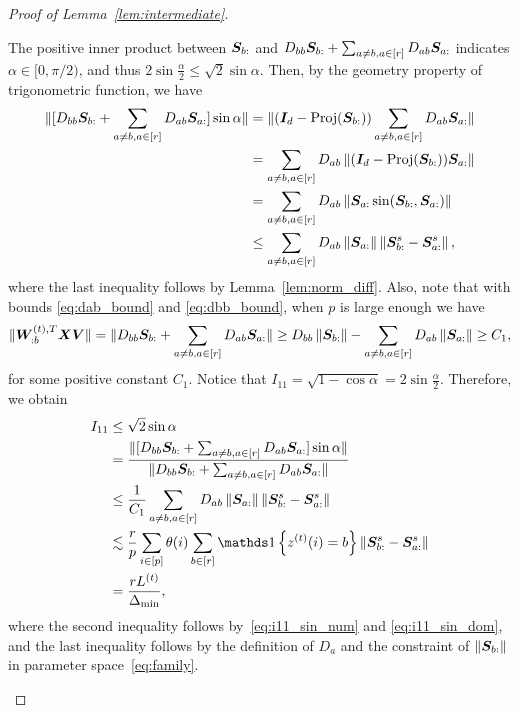 \documentclass[lettersize,journal]{IEEEtran}
\theoremstyle{definition}
\theoremstyle{definition}
\newcommand{\offf}[1]{\left\{#1\right\}}
\begin{document}
\begin{proof}[Proof of Lemma~\ref{lem:intermediate}]
\begin{enumerate}
    The positive inner product between $\bm S_{b:}$ and $D_{bb} \bm S_{b:} + \sum_{a \neq b, a \in [r]} D_{ab} \bm S_{a:}$ indicates $\alpha \in [0,  \pi/2)$, and thus $2\sin \frac{\alpha}{2} \leq \sqrt{2} \sin \alpha$. Then, by the geometry property of trigonometric function, we have 
    \begin{align}
       \onormSize{}{ [D_{bb} \mS_{b:} + \sum_{a \neq b, a \in [r]} D_{ab} \mS_{a:}] \sin \alpha} &= \onormSize{}{(\mI_d - \text{Proj}(\mS_{b:})) \sum_{a \neq b, a \in [r]} D_{ab} \mS_{a:}}\\
       & = \sum_{a \neq b, a \in [r]} D_{ab} \onorm{(\mI_d - \text{Proj}(\mS_{b:}))\mS_{a:}  }\\
       &= \sum_{a \neq b, a \in [r]} D_{ab} \onorm{ \mS_{a:} \sin (\mS_{b:}, \mS_{a:}) }\\
       & \leq \sum_{a \neq b, a \in [r]} D_{ab} \onorm{\mS_{a:}} \onorm{ \mS^s_{b:} - \mS^s_{a:}}, \label{eq:i11_sin_num}
    \end{align}
    where the last inequality follows by Lemma~\ref{lem:norm_diff}. Also, note that with bounds \eqref{eq:dab_bound} and \eqref{eq:dbb_bound}, when $p$ is large enough we have 
    \begin{equation}\label{eq:i11_sin_dom}
           \onormSize{}{\mW_{:b}^{(t), T} \mX \mV } = \onormSize{}{ D_{bb} \mS_{b:} + \sum_{a \neq b, a \in [r]} D_{ab} \mS_{a:}}  \geq D_{bb} \onorm{\mS_{b:}} - \sum_{a \neq b, a \in [r]} D_{ab} \onorm{ \mS_{a:}} \geq C_1,
    \end{equation}
    for some positive constant $C_1$. Notice that $I_{11} = \sqrt{1 - \cos \alpha} = 2 \sin \frac{\alpha}{2}$. Therefore, we obtain
    \begin{align}
        I_{11} &\leq \sqrt{2} \sin \alpha \\
        & = \frac{  \onormSize{}{ [D_{bb} \mS_{b:} + \sum_{a \neq b, a \in [r]} D_{ab} \mS_{a:}] \sin \alpha}}{  \onormSize{}{ D_{bb} \mS_{b:} + \sum_{a \neq b, a \in [r]} D_{ab} \mS_{a:}} } \\
        & \leq \frac{ 1}{C_1}  \sum_{a \neq b, a \in [r]} D_{ab} \onorm{\mS_{a:}} \onorm{ \mS^s_{b:} - \mS^s_{a:}} \\
        & \lesssim \frac{r}{p} \sum_{i \in [p]} \theta(i) \sum_{b \in [r]} \ind\offf{z^{(t)}(i) = b} \onorm{ \mS^s_{b:} - \mS^s_{a:}}\\
        & = \frac{r L^{(t)}}{\Delta_{\min}},\label{eq:i11}
    \end{align}
    where the second inequality follows by~\eqref{eq:i11_sin_num} and \eqref{eq:i11_sin_dom}, and the last inequality follows by the definition of $D_a$ and the constraint of $\left\lVert\bm S_{b:}\right\rVert$ in parameter space~\eqref{eq:family}.
    

\end{enumerate}
\end{proof}
\end{document}
